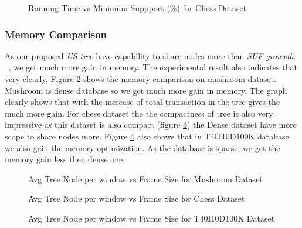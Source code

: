 			\begin{figure}
			\centering
				
			\caption{Running Time vs Minimum Suppport (\%) for Chess Dataset ~\cite{dataset}}
			\label{result:g_chess_total}
			\end{figure}

\clearpage		
	\subsubsection{Memory Comparison}
		As our proposed \emph{US-tree} have capability to share nodes more than \emph{SUF-grouwth} ~\cite{dataset}, we get much more gain in memory. The experimental result also indicates that very clearly. Figure \ref{result:g_m_memory_node} shows the memory comparison on mushroom dataset. Mushroom is dense database so we get  much more gain in memory. The graph clearly shows that with the increase of total transaction in the tree gives the much more gain. For chess dataset the the compactness of tree is also very impressive as this dataset is also compact (figure \ref{result:g_chess_memory_node}) the Dense dataset have more scope to share nodes more. Figure \ref{result:g_t10_memory_node} also shows that in T40I10D100K database we also gain the memory optimization. As the database is sparse, we get the memory gain less then dense one.
			\begin{figure}[h]
			\centering
				
			\caption{Avg Tree Node per window vs Frame Size for Mushroom Dataset ~\cite{dataset}}
			\label{result:g_m_memory_node}
			\end{figure}
			
			\begin{figure}[h]
			\centering
				
			\caption{Avg Tree Node per window vs Frame Size for Chess Dataset ~\cite{dataset}}
			\label{result:g_chess_memory_node}
			\end{figure}
			
			\begin{figure}[h]
				
			\caption{Avg Tree Node per window vs Frame Size for T40I10D100K Dataset ~\cite{dataset}}
			\label{result:g_t10_memory_node}
			\end{figure}
		